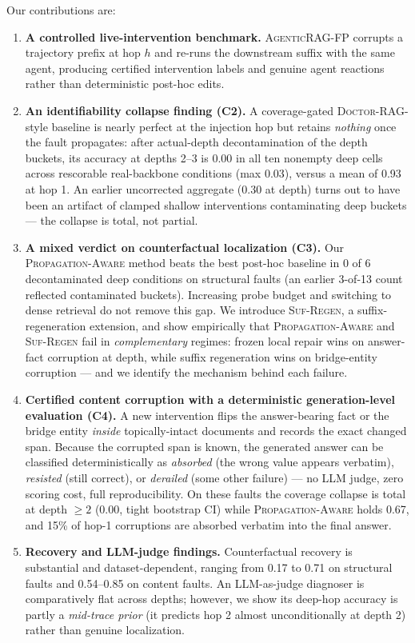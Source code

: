 \documentclass[11pt]{article}
\newcommand{\ours}{\textnormal{\textsc{AgenticRAG-FP}}}
\newcommand{\dr}{\textnormal{\textsc{Doctor-RAG}}}
\newcommand{\pa}{\textnormal{\textsc{Propagation-Aware}}}
\newcommand{\sr}{\textnormal{\textsc{Suf-Regen}}}
\begin{document}
Our contributions are:
\begin{enumerate}[leftmargin=*]
  \item \textbf{A controlled live-intervention benchmark.}  \ours{} corrupts a
  trajectory prefix at hop $h$ and re-runs the downstream suffix with the same
  agent, producing certified intervention labels and genuine agent reactions rather
  than deterministic post-hoc edits.

  \item \textbf{An identifiability collapse finding (C2).}  A coverage-gated
  \dr-style baseline is nearly perfect at the injection hop but retains
  \emph{nothing} once the fault propagates: after actual-depth decontamination
  of the depth buckets, its accuracy at depths 2--3 is 0.00 in all ten
  nonempty deep cells across rescorable real-backbone conditions (max 0.03),
  versus a mean of 0.93 at hop 1.  An earlier uncorrected aggregate (0.30 at
  depth) turns out to have been an artifact of clamped shallow interventions
  contaminating deep buckets --- the collapse is total, not partial.

  \item \textbf{A mixed verdict on counterfactual localization (C3).}  Our \pa{}
  method beats the best post-hoc baseline in 0 of 6 decontaminated deep
  conditions on structural faults (an earlier 3-of-13 count reflected
  contaminated buckets).  Increasing probe budget and switching to dense
  retrieval do not remove this gap.  We introduce \sr, a suffix-regeneration extension,
  and show empirically that \pa{} and \sr{} fail in \emph{complementary}
  regimes: frozen local repair wins on answer-fact corruption at depth, while
  suffix regeneration wins on bridge-entity corruption --- and we identify the
  mechanism behind each failure.

  \item \textbf{Certified content corruption with a deterministic
  generation-level evaluation (C4).}  A new intervention flips the
  answer-bearing fact or the bridge entity \emph{inside} topically-intact
  documents and records the exact changed span.  Because the corrupted span is
  known, the generated answer can be classified deterministically as
  \emph{absorbed} (the wrong value appears verbatim), \emph{resisted} (still
  correct), or \emph{derailed} (some other failure) --- no LLM judge, zero
  scoring cost, full reproducibility.  On these faults the coverage collapse is
  total at depth $\geq 2$ (0.00, tight bootstrap CI) while \pa{} holds 0.67,
  and 15\% of hop-1 corruptions are absorbed verbatim into the final answer.

  \item \textbf{Recovery and LLM-judge findings.}  Counterfactual recovery is
  substantial and dataset-dependent, ranging from 0.17 to 0.71 on structural
  faults and 0.54--0.85 on content faults.  An LLM-as-judge diagnoser is
  comparatively flat across depths; however, we show its deep-hop accuracy is
  partly a \emph{mid-trace prior} (it predicts hop 2 almost unconditionally at
  depth 2) rather than genuine localization.
\end{enumerate}
\end{document}
